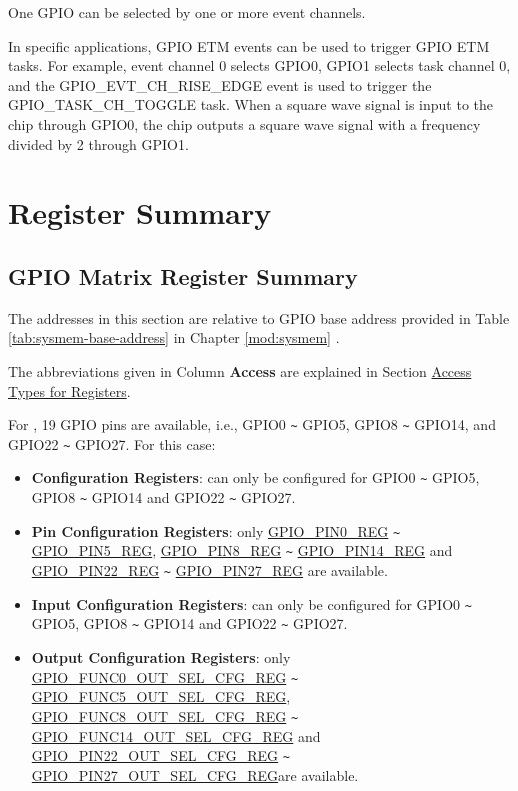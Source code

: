 \documentclass[main\_\_EN.tex]{subfiles}
\begin{document}
\begin{tiplisting}
One GPIO can be selected by one or more event channels.
\end{tiplisting}

In specific applications, GPIO ETM events can be used to trigger GPIO ETM tasks. For example, event channel 0 selects GPIO0, GPIO1 selects task channel 0, and the GPIO\_EVT\_CH\_RISE\_EDGE event is used to trigger the GPIO\_TASK\_CH\_TOGGLE task. When a square wave signal is input to the chip through GPIO0, the chip outputs a square wave signal with a frequency divided by 2 through GPIO1.


\clearpage
\hypertarget{iomuxgpio-reg-summ}{}
\section{Register Summary}
\subsection{GPIO Matrix Register Summary}
The addresses in this section are relative to GPIO base address provided in Table \ref{tab:sysmem-base-address} in Chapter \ref{mod:sysmem} \textit{}.

The abbreviations given in Column \textbf{Access} are explained in Section \hyperref[glossary-access-types]{Access Types for Registers}.

For \chipname{}, 19 GPIO pins are available, i.e., GPIO0 \verb+~+ GPIO5, GPIO8 \verb+~+ GPIO14, and GPIO22 \verb+~+ GPIO27. For this case:
\begin{itemize}
    \item \textbf{Configuration Registers}: can only be configured for GPIO0 \verb+~+ GPIO5, GPIO8 \verb+~+ GPIO14 and GPIO22 \verb+~+ GPIO27.
    \item \textbf{Pin Configuration Registers}: only \hyperref[regdesc:GPIOPINNREG]{GPIO\_PIN0\_REG} \verb+~+ \hyperref[regdesc:GPIOPINNREG]{GPIO\_PIN5\_REG}, \hyperref[regdesc:GPIOPINNREG]{GPIO\_PIN8\_REG} \verb+~+ \hyperref[regdesc:GPIOPINNREG]{GPIO\_PIN14\_REG} and \hyperref[regdesc:GPIOPINNREG]{GPIO\_PIN22\_REG} \verb+~+ \hyperref[regdesc:GPIOPINNREG]{GPIO\_PIN27\_REG} are available.
    \item \textbf{Input Configuration Registers}: can only be configured for GPIO0 \verb+~+ GPIO5, GPIO8 \verb+~+ GPIO14 and GPIO22 \verb+~+ GPIO27.
    \item \textbf{Output Configuration Registers}: only \hyperref[regdesc:GPIOFUNCNOUTSELCFGREG]{GPIO\_FUNC0\_OUT\_SEL\_CFG\_REG} \verb+~+ \hyperref[regdesc:GPIOFUNCNOUTSELCFGREG]{GPIO\_FUNC5\_OUT\_SEL\_CFG\_REG}, \hyperref[regdesc:GPIOFUNCNOUTSELCFGREG]{GPIO\_FUNC8\_OUT\_SEL\_CFG\_REG} \verb+~+ \hyperref[regdesc:GPIOFUNCNOUTSELCFGREG]{GPIO\_FUNC14\_OUT\_SEL\_CFG\_REG} and \hyperref[regdesc:GPIOFUNCNOUTSELCFGREG]{GPIO\_PIN22\_OUT\_SEL\_CFG\_REG} \verb+~+ \hyperref[regdesc:GPIOFUNCNOUTSELCFGREG]{GPIO\_PIN27\_OUT\_SEL\_CFG\_REG}are available.
\end{itemize}
\end{document}
